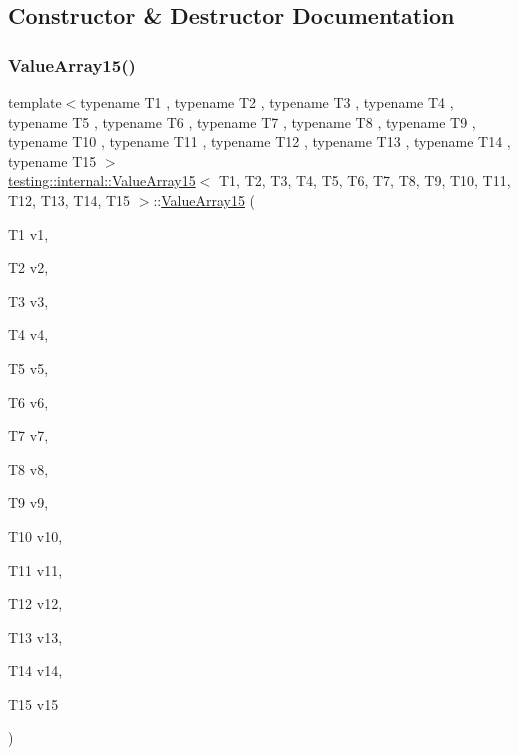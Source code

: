 \subsection{Constructor \& Destructor Documentation}
\mbox{\label{classtesting_1_1internal_1_1_value_array15_a2f9c6670b744cb08587bea1b50e169b4}} 
\subsubsection{\texorpdfstring{ValueArray15()}{ValueArray15()}\hspace{0.1cm}{\footnotesize\ttfamily [1/2]}}
{\footnotesize\ttfamily template$<$typename T1 , typename T2 , typename T3 , typename T4 , typename T5 , typename T6 , typename T7 , typename T8 , typename T9 , typename T10 , typename T11 , typename T12 , typename T13 , typename T14 , typename T15 $>$ \\
\mbox{\hyperlink{classtesting_1_1internal_1_1_value_array15}{testing\+::internal\+::\+Value\+Array15}}$<$ T1, T2, T3, T4, T5, T6, T7, T8, T9, T10, T11, T12, T13, T14, T15 $>$\+::\mbox{\hyperlink{classtesting_1_1internal_1_1_value_array15}{Value\+Array15}} (\begin{DoxyParamCaption}\item[{T1}]{v1,  }\item[{T2}]{v2,  }\item[{T3}]{v3,  }\item[{T4}]{v4,  }\item[{T5}]{v5,  }\item[{T6}]{v6,  }\item[{T7}]{v7,  }\item[{T8}]{v8,  }\item[{T9}]{v9,  }\item[{T10}]{v10,  }\item[{T11}]{v11,  }\item[{T12}]{v12,  }\item[{T13}]{v13,  }\item[{T14}]{v14,  }\item[{T15}]{v15 }\end{DoxyParamCaption})\hspace{0.3cm}{\ttfamily [inline]}}

